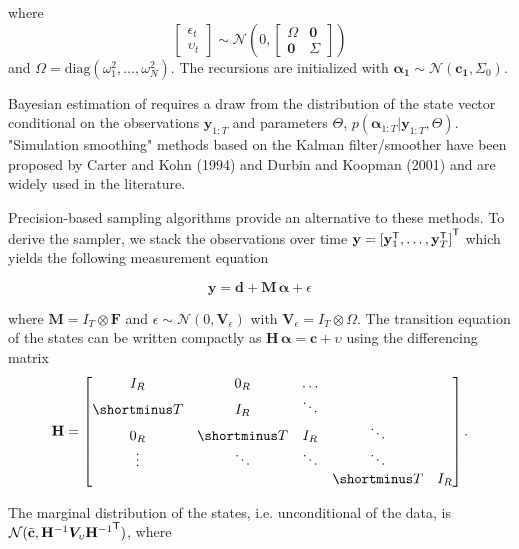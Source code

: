 \documentclass[notitlepage,a4paper,12pt]{article}
\newcommand{\transpose}[1]{{#1}^{\sf{T}}}
\begin{document}
where 
$$
\begin{bmatrix}
    \epsilon_t \\
    \upsilon_t
\end{bmatrix}
\sim \mathcal{N}(0,
\begin{bmatrix}
\Omega & \mathbf{0} \\
\mathbf{0} & \Sigma
\end{bmatrix}
)
$$
and $\Omega = \text{diag}(\omega^2_{1}, \dots, \omega^2_{N})$. The recursions are initialized with $\boldsymbol{\alpha_1} \sim \mathcal{N}(\mathbf{c_1}, \Sigma_0)$.

Bayesian estimation of  requires a draw from the distribution of the state vector conditional on the observations $\mathbf{y}_{1:T}$ and parameters $\Theta$, $p(\mathbf{\alpha}_{1:T}|\mathbf{y}_{1:T}, \Theta)$. "Simulation smoothing" methods based on the Kalman filter/smoother have been proposed by Carter and Kohn (1994) and Durbin and Koopman (2001) and are widely used in the literature.

Precision-based sampling algorithms \citep{chanjeliazkov_2009} provide an alternative to these methods. To derive the sampler, we stack the observations over time $\mathbf{y} = \transpose{[\transpose{\mathbf{y}}_1, \dots, \transpose{\mathbf{y}}_T]}$ which yields the following measurement equation

\begin{equation}
\mathbf{y} = \mathbf{d} + \mathbf{M} \, \boldsymbol{\alpha} + \epsilon
\end{equation} 

where $ \mathbf{M} = I_T \otimes \mathbf{F}$ and $\epsilon \sim \mathcal{N}(0, \mathbf{V}_{\epsilon})$ with $\mathbf{V}_{\epsilon} = I_T \otimes \Omega$. The transition equation of the states can be written compactly as $\mathbf{H}\, \boldsymbol{\alpha} = \mathbf{c} + \upsilon$ using the differencing matrix 
$$
\mathbf{H}
=
\begin{bmatrix}
    I_R & 0_R & \dots \\
    \shortminus T & I_R & \ddots \\
    0_R & \shortminus T & I_R & \ddots \\
    \vdots & \ddots & \ddots & \ddots \\
    & & & \shortminus T & I_R
\end{bmatrix}.
$$

The marginal distribution of the states, i.e. unconditional of the data, is $\mathcal{N}(\tilde{\mathbf{c}},\mathbf{H}^{-1} \bm{V}_{\upsilon} \transpose{\mathbf{H}^{-1}})$, where 
\end{document}
